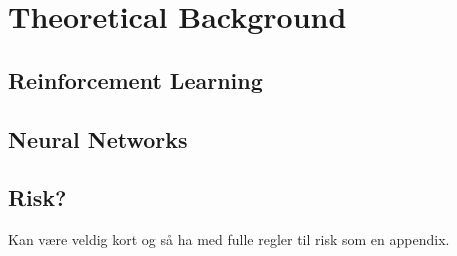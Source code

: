 \documentclass[../Main/thesis.tex]{subfiles}
\begin{document}
\chapter[Theoretical Background]{Theoretical Background}
\label{ch:equations}

\section{Reinforcement Learning}

\section{Neural Networks}

\section{Risk?}
Kan være veldig kort og så ha med fulle regler til risk som en appendix.
\end{document}
